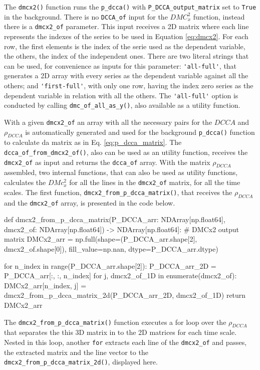 \documentclass[article]{jss}
\begin{document}
The \verb"dmcx2()" function runs the \verb"p_dcca()" with \verb"P_DCCA_output_matrix" set to \verb"True" in the background. There is no \verb"DCCA_of" input for the $DMC_x^2$ function, instead there is a \verb"dmcx2_of" parameter. This input receives a 2D matrix where each line represents the indexes of the series to be used in Equation \ref{eq:dmcx2}. For each row, the first elements is the index of the serie used as the dependent variable, the others, the index of the independent ones. There are two literal strings that can be used, for convenience as inputs for this parameter: \verb"'all-full'", that generates a 2D array with every series as the dependent variable against all the others; and \verb"'first-full'", with only one row, having the index zero series as the dependent variable in relation with all the others. The \verb"'all-full'" option is conducted by calling \verb"dmc_of_all_as_y()", also available as a utility function.

With a given \verb"dmcx2_of" an array with all the necessary pairs for the $DCCA$ and $\rho_{DCCA}$ is automatically generated and used for the background \verb"p_dcca()" function to calculate da matrix as in Eq. \ref{eq:p_dcca_matrix}. The \verb"dcca_of_from_dmcx2_of()", also can be used as an utility function, receives the  \verb"dmcx2_of" as input and returns the \verb"dcca_of" array. With the matrix $\rho_{DCCA}$ assembled, two internal functions, that can also be used as utility functions, calculates the $DMc_{x}^2$ for all the lines in the \verb"dmcx2_of" matrix, for all the time scales. The first function, \verb"dmcx2_from_p_dcca_matrix()", that receives the $\rho_{DCCA}$ and the \verb"dmcx2_of" array, is presented in the code below.

\begin{Code}
def dmcx2_from_p_dcca_matrix(P_DCCA_arr: NDArray[np.float64], 
      dmcx2_of: NDArray[np.float64]) -> NDArray[np.float64]:   
    # DMCx2 output matrix
    DMCx2_arr = np.full(shape=(P_DCCA_arr.shape[2], dmcx2_of.shape[0]),
    fill_value=np.nan, dtype=P_DCCA_arr.dtype)

    for n_index in range(P_DCCA_arr.shape[2]):
        P_DCCA_arr_2D = P_DCCA_arr[:, :, n_index]
        for j,  dmcx2_of_1D in enumerate(dmcx2_of):
            DMCx2_arr[n_index, j] = dmcx2_from_p_dcca_matrix_2d(P_DCCA_arr_2D,
                                                                dmcx2_of_1D)
    return DMCx2_arr
\end{Code}

The \verb"dmcx2_from_p_dcca_matrix()" function executes a for loop over the $\rho_{DCCA}$ that separates the this 3D matrix in to the 2D matrices for each time scale. Nested in this loop, another \verb"for" extracts each line of the \verb"dmcx2_of" and passes, the extracted matrix and the line vector to the \verb"dmcx2_from_p_dcca_matrix_2d()", displayed here.
\end{document}

